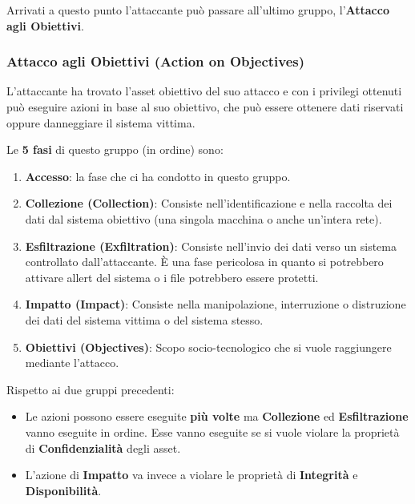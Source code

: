 \documentclass{article}
\begin{document}
Arrivati a questo punto l'attaccante può passare all'ultimo gruppo, l'\textbf{Attacco agli Obiettivi}.

\subsubsection{Attacco agli Obiettivi (Action on Objectives)}
L'attaccante ha trovato l'asset obiettivo del suo attacco e con i privilegi ottenuti può eseguire azioni in base al suo obiettivo, che può essere ottenere dati riservati oppure danneggiare il sistema vittima.

Le \textbf{5 fasi} di questo gruppo (in ordine) sono:
\begin{enumerate}
    \item \textbf{Accesso}: la fase che ci ha condotto in questo gruppo.
    \item \textbf{Collezione (Collection)}: Consiste nell'identificazione e nella raccolta dei dati dal sistema obiettivo (una singola macchina o anche un'intera rete).
    \item \textbf{Esfiltrazione (Exfiltration)}: Consiste nell'invio dei dati verso un sistema controllato dall'attaccante. È una fase pericolosa in quanto si potrebbero
    attivare allert del sistema o i file potrebbero essere protetti.
    \item \textbf{Impatto (Impact)}: Consiste nella manipolazione, interruzione o distruzione dei dati del sistema vittima o del sistema stesso.
    \item \textbf{Obiettivi (Objectives)}: Scopo socio-tecnologico che si vuole raggiungere mediante l'attacco.
\end{enumerate}

Rispetto ai due gruppi precedenti:
\begin{itemize}
    \item Le azioni possono essere eseguite \textbf{più volte} ma \textbf{Collezione} ed \textbf{Esfiltrazione} vanno eseguite in ordine. Esse vanno eseguite se si vuole violare la proprietà di \textbf{Confidenzialità} degli asset.

    \item L'azione di \textbf{Impatto} va invece a violare le proprietà di \textbf{Integrità} e \textbf{Disponibilità}.
\end{itemize}
\newpage
\end{document}
